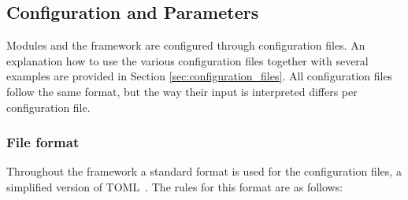 \subsection{Configuration and Parameters}
\label{sec:config_parameters}
Modules and the framework are configured through configuration files. An explanation how to use the various configuration files together with several examples are provided in Section \ref{sec:configuration_files}. All configuration files follow the same format, but the way their input is interpreted differs per configuration file.

\subsubsection{File format}
\label{sec:config_file_format}
Throughout the framework a standard format is used for the configuration files, a simplified version of TOML~\cite{tomlgit}. The rules for this format are as follows:
